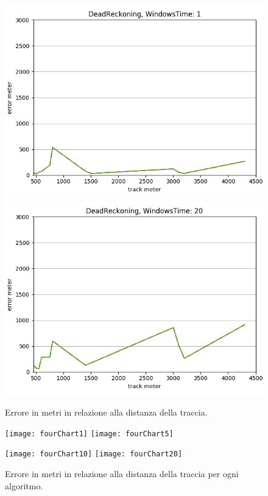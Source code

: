 \documentclass[12pt,a4paper,openright,twoside]{report}
\begin{document}
\begin{figure}[H]
\centering 
\includegraphics[scale=0.4]{thirdChartDeadReckoning-1} 
\includegraphics[scale=0.4]{thirdChartDeadReckoning-20} 
\caption{Errore in metri in relazione alla distanza della traccia.} 

\end{figure}


\begin{figure}[H]
\centering 
\texttt{[image: fourChart1]} 
\texttt{[image: fourChart5]} 
\end{figure}

\begin{figure}[H]
\centering  
\texttt{[image: fourChart10]} 
\texttt{[image: fourChart20]} 
\caption{Errore in metri in relazione alla distanza della traccia per ogni algoritmo.} 

\end{figure}
\end{document}
